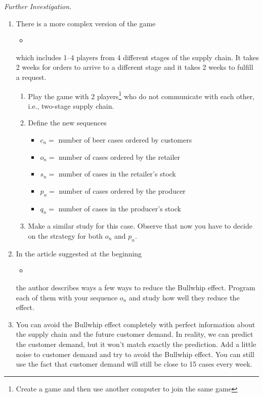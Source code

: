 \emph{Further Investigation. } 
\begin{enumerate}[label=\emph{\arabic*.}]
\item There is a more complex version of the game 
\begin{itemize}
	\item {}
\end{itemize}
which includes 1--4 players from 4 different stages of the supply chain. It takes 2 weeks for orders to arrive to a different stage and it takes 2 weeks to fulfill a request.

\begin{enumerate}[label = \emph{(\alph*)}]
\item Play the game with 2 players\footnote{Create a game and then use another computer to join the same game} who do not communicate with each other, i.e., two-stage supply chain.

\item Define the new sequences
\begin{itemize}
\item $c_n = $ number of beer cases ordered by customers
\item $o_n = $ number of cases ordered by the retailer
\item $s_n = $ number of cases in the retailer's stock
\item $p_n = $ number of cases ordered by the producer
\item $q_n = $ number of cases in the producer's stock
\end{itemize}

\item Make a similar study for this case. Observe that now you have to decide on the strategy for both $o_n$ and $p_n$.
\end{enumerate}


\item In the article suggested at the beginning
\begin{itemize}
\item {}
\end{itemize}
the author describes ways a few ways to reduce the Bullwhip effect. Program each of them with your sequence $o_n$ and study how well they reduce the effect.


\item You can avoid the Bullwhip effect completely with perfect information about the supply chain and the future customer demand. In reality, we can predict the customer demand, but it won't match exactly the prediction. Add a little noise to customer demand and try to avoid the Bullwhip effect. You can still use the fact that customer demand will still be close to 15 cases every week.

\end{enumerate}

\begin{noexercises}
\end{noexercises}
